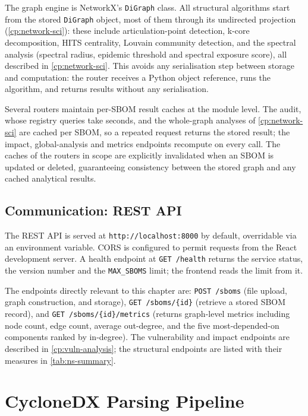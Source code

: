 The graph engine is NetworkX's \texttt{DiGraph} class. All structural algorithms start from the stored \texttt{DiGraph} object, most of them through its undirected projection (\autoref{cp:network-sci}): these include articulation-point detection, k-core decomposition, HITS centrality, Louvain community detection, and the spectral analysis (spectral radius, epidemic threshold and spectral exposure score), all described in \autoref{cp:network-sci}. This avoids any serialisation step between storage and computation: the router receives a Python object reference, runs the algorithm, and returns results without any serialisation.

Several routers maintain per-SBOM result caches at the module level. The audit, whose registry queries take seconds, and the whole-graph analyses of \autoref{cp:network-sci} are cached per SBOM, so a repeated request returns the stored result; the impact, global-analysis and metrics endpoints recompute on every call. The caches of the routers in scope are explicitly invalidated when an SBOM is updated or deleted, guaranteeing consistency between the stored graph and any cached analytical results.


\subsection{Communication: REST API}
\label{sec:rest-api}

The REST API is served at \texttt{http://localhost:8000} by default, overridable via an environment variable. CORS is configured to permit requests from the React development server. A health endpoint at \texttt{GET /health} returns the service status, the version number and the \texttt{MAX\_SBOMS} limit; the frontend reads the limit from it.

The endpoints directly relevant to this chapter are: \texttt{POST /sboms} (file upload, graph construction, and storage), \texttt{GET /sboms/\{id\}} (retrieve a stored SBOM record), and \texttt{GET /sboms/\{id\}/metrics} (returns graph-level metrics including node count, edge count, average out-degree, and the five most-depended-on components ranked by in-degree). The vulnerability and impact endpoints are described in \autoref{cp:vuln-analysis}; the structural endpoints are listed with their measures in \autoref{tab:ns-summary}.


\section{CycloneDX Parsing Pipeline}
\label{sec:parsing-pipeline}

